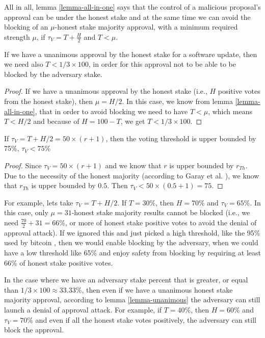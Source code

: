 All in all, lemma \ref{lemma-all-in-one} says that the control of a malicious proposal's approval can be under the honest stake and at the same time we can avoid the blocking of an $\mu$-honest stake majority approval, with a minimum required strength $\mu$, if $\tau_V = T + \frac{H}{2}$ and $T < \mu$.

\begin{lemma} \label{lemma-unanimous}
If we have a unanimous approval by the honest stake for a software update, then we need also $T < 1/3 \times 100$, in order for this approval not to be able to be blocked by the adversary stake.
\end{lemma}
\begin{proof}
If we have a unanimous approval by the honest stake (i.e., $H$ positive votes from the honest stake), then $\mu = H/2$. In this case, we know from lemma \ref{lemma-all-in-one}, that in order to avoid blocking we need to have $T < \mu$, which means $ T < H/2$ and because of $H = 100 -T$, we get $T < 1/3 \times 100$.
\end{proof}

\begin{lemma}
If $\tau_V = T + H/2 =  50 \times (r + 1)$, then the voting threshold is upper bounded by 75\%, $\tau_V < 75\%$
\end{lemma}
\begin{proof}
Since $\tau_V =  50 \times (r + 1)$ and we know that $r$ is upper bounded by $r_{Th}$. Due to the necessity of the honest majority (according to Garay et al. \cite{sok}), we know that $r_{Th}$ is upper bounded by $0.5$. Then $\tau_V <  50 \times (0.5 + 1) = 75$.
\end{proof}

For example, lets take $\tau_V = T + H/2$. If $T = 30\%$, then $H = 70\%$ and $\tau_V = 65\%$. In this case, only $\mu = 31$-honest stake majority results cannot be blocked (i.e., we need $ \frac{70}{2} + 31 = 66\%$, or more of honest stake positive votes to avoid the denial of approval attack). If we ignored this and just picked a high threshold, like the 95\% used by bitcoin \cite{bitcoin}, then we would enable blocking by the adversary, when we could have a low threshold like 65\% and enjoy safety from blocking by requiring at least 66\% of honest stake positive votes.


In the case where we have an adversary stake percent that is greater, or equal than $1/3 \times 100 \approx 33.33\%$, then even if we have a unanimous honest stake majority approval, according to lemma \ref{lemma-unanimous} the adversary can still launch a denial of approval attack. For example, if $T = 40\%$, then $H = 60\%$ and $\tau_V = 70\%$ and even if all the honest stake votes positively, the adversary can still block the approval.

